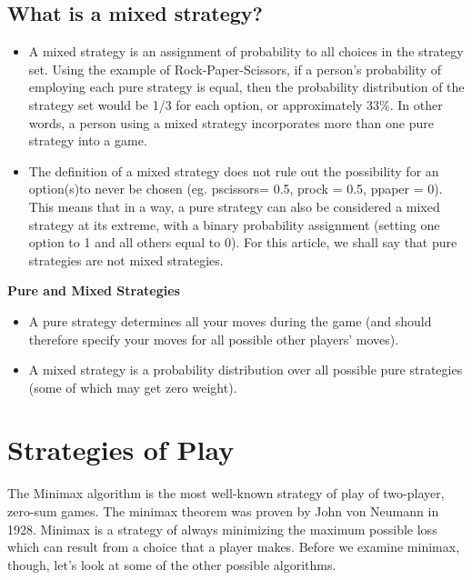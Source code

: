 \documentclass[a4paper,12pt]{article}
\begin{document}
\subsection{What is a mixed strategy?}
\begin{itemize}
\item A mixed strategy is an assignment of probability to all choices in the strategy set. Using the example of Rock-Paper-Scissors, if a person’s probability of employing each pure strategy is equal, then the probability distribution of the strategy set would be 1/3 for each option, or approximately 33\%. In other words, a person using a mixed strategy incorporates more than one pure strategy into a game.

\item The definition of a mixed strategy does not rule out the possibility for an option(s)to never be chosen (eg. pscissors= 0.5, prock = 0.5, ppaper = 0). This means that in a way, a pure strategy can also be considered a mixed strategy at its extreme, with a binary probability assignment (setting one option to 1 and all others equal to 0). For this article, we shall say that pure strategies are not mixed strategies.
\end{itemize}

\begin{framed}
\noindent \textbf{Pure and Mixed Strategies}


\begin{itemize}
\item A pure strategy determines all your moves during the game (and should therefore specify your moves for all possible other players' moves). 
\item A mixed strategy is a probability distribution over all possible pure strategies (some of which may get zero weight).
\end{itemize}
\end{framed}





\section{Strategies of Play}
The Minimax algorithm is the most well-known strategy of play of two-player, zero-sum games. The minimax theorem was proven by John von Neumann in 1928. Minimax is a strategy of always minimizing the maximum possible loss which can result from a choice that a player makes. Before we examine minimax, though, let's look at some of the other possible algorithms.
\end{document}
